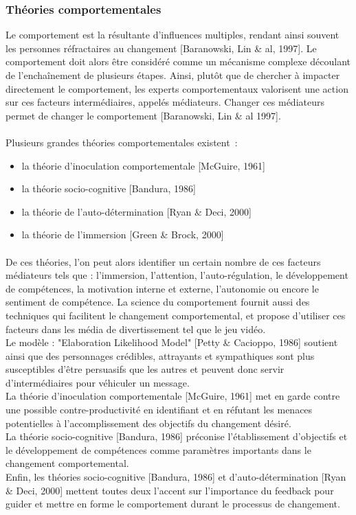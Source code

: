		\subsubsection*{Théories comportementales}
Le comportement est la résultante d’influences multiples, rendant ainsi souvent les personnes réfractaires au changement [Baranowski, Lin \& al, 1997]\cite{Bara97}. Le comportement doit alors être considéré comme un mécanisme complexe découlant de l’enchaînement de plusieurs étapes. Ainsi, plutôt que de chercher à impacter directement le comportement, les experts comportementaux valorisent une action sur ces facteurs intermédiaires, appelés médiateurs. Changer ces médiateurs permet de changer le comportement [Baranowski, Lin \& al 1997]\cite{Bara97}.
\paragraph{}Plusieurs grandes théories comportementales existent~:
\begin{itemize}
	\item la théorie d’inoculation comportementale [McGuire, 1961]
	\item la théorie socio-cognitive [Bandura, 1986]
	\item la théorie de l’auto-détermination [Ryan \& Deci, 2000]
	\item la théorie de l’immersion [Green \& Brock, 2000]
\end{itemize}

\paragraph{}De ces théories, l’on peut alors identifier un certain nombre de ces facteurs médiateurs tels que : l’immersion, l’attention, l’auto-régulation, le développement de compétences, la motivation interne et externe, l’autonomie ou encore le sentiment de compétence. La science du comportement fournit aussi des techniques qui facilitent le changement comportemental, et propose d’utiliser ces facteurs dans les média de divertissement tel que le jeu vidéo.\\
Le modèle : "Elaboration Likelihood Model" [Petty \& Cacioppo, 1986] soutient ainsi que des personnages crédibles, attrayants et sympathiques sont plus susceptibles d’être persuasifs que les autres et peuvent donc servir d’intermédiaires pour véhiculer un message. \\
La théorie d’inoculation comportementale [McGuire, 1961] met en garde contre une possible contre-productivité en identifiant et en réfutant les menaces potentielles à l’accomplissement des objectifs du changement désiré.\\
La théorie socio-cognitive [Bandura, 1986] préconise l’établissement d’objectifs et le développement de compétences comme paramètres importants dans le changement comportemental.\\
Enfin, les théories socio-cognitive [Bandura, 1986] et d’auto-détermination [Ryan \& Deci, 2000] mettent toutes deux l’accent sur l’importance du feedback pour guider et mettre en forme le comportement durant le processus de changement.	

